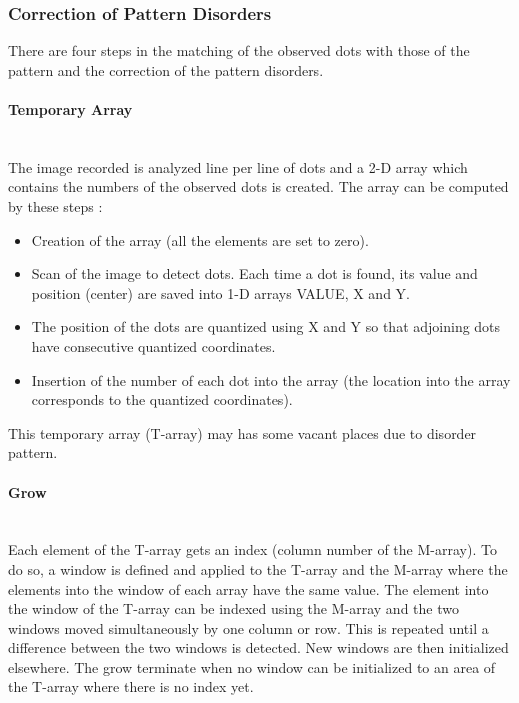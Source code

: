 \subsubsection{Correction of Pattern Disorders}
There are four steps in the matching of the observed dots with those of the pattern and the correction of the pattern disorders.





\paragraph*{Temporary Array}
~~\\
The image recorded is analyzed line per line of dots and a 2-D array which contains the numbers of the observed dots is created. The array can be computed by these steps :
\begin{itemize}
\item Creation of the array (all the elements are set to zero).
\item Scan of the image to detect dots. Each time a dot is found, its value and position (center) are saved into 1-D arrays VALUE, X and Y.
\item The position of the dots are quantized using X and Y so that adjoining dots have consecutive quantized coordinates.
\item Insertion of the number of each dot into the array (the location into the array corresponds to the quantized coordinates).
\end{itemize}

This temporary array (T-array) may has some vacant places due to disorder pattern.

\paragraph*{Grow}
~~\\
Each element of the T-array gets an index (column number of the M-array). To do so, a window is defined and applied to the T-array and the M-array where the elements into the window of each array have the same value. The element into the window of the T-array can be indexed using the M-array and the two windows moved simultaneously by one column or row. This is repeated until a difference between the two windows is detected. New windows are then initialized elsewhere. The grow terminate when no window can be initialized to an area of the T-array where there is no index yet.


